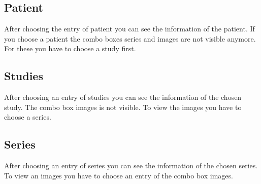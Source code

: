 \begin{minipage}{\textwidth} 
\centering
{}
\label{fig:bild}
\end{minipage}

	\subsection{Patient}
	After choosing the entry of patient you can see the information of the
	patient. If you choose a patient the combo boxes series and images are not
	visible anymore. For these you have to choose a study first.
	
	\subsection{Studies}
	After choosing an entry of studies you can see the information of the chosen
	study. The combo box images is not visible. To view the images you have to
	choose a series.\\
	
	\begin{minipage}{\textwidth} 
	\centering
	\label{fig:bild}
	\end{minipage}
	
	\subsection{Series}
	After choosing an entry of series you can see the information of the chosen
	series. To view an images you have to choose an entry of the combo box
	images.\\
	
	\begin{minipage}{\textwidth} 
	\centering
	\label{fig:bild}
	\end{minipage}
	
